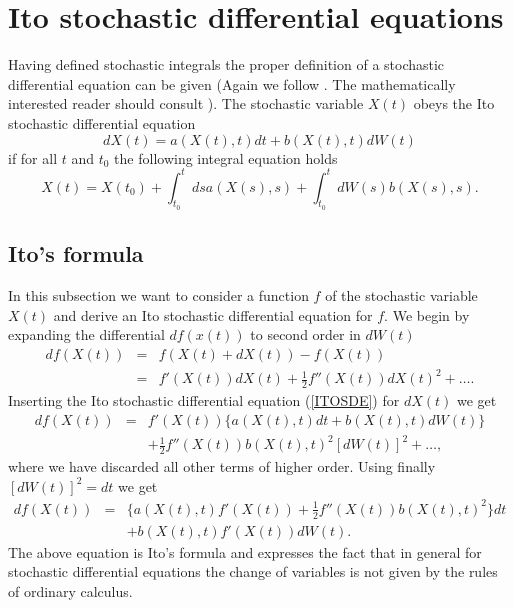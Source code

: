 \section{Ito stochastic differential equations}
Having defined stochastic integrals the proper definition of a
stochastic differential equation can be given (Again we follow 
\cite{GARDINER}. The mathematically interested reader should
consult \cite{GARD,KLOEDEN_AN,POTTER}). The stochastic variable
$X(t)$ obeys the Ito stochastic differential equation
\begin{equation}
\label{ITOSDE}
dX(t) = a(X(t),t) dt + b(X(t),t) dW(t)
\end{equation}
if for all $t$ and $t_0$ the following integral equation holds
\begin{equation}
X(t) = X(t_0) + \int_{t_0}^t ds a(X(s),s) 
     + \int_{t_0}^t dW(s) b(X(s),s).
\end{equation}

\subsection{Ito's formula}
In this subsection we want to consider a function
$f$ of the stochastic variable $X(t)$ and derive an Ito stochastic
differential equation for $f$. We begin by expanding the differential 
$df(x(t))$ to second order in $dW(t)$
\begin{eqnarray*}
df(X(t)) & = & f(X(t)+dX(t)) - f(X(t)) \\
         & = & f'(X(t)) dX(t) + \frac{1}{2} f''(X(t)) dX(t)^2 + \ldots.
\end{eqnarray*}
Inserting the Ito stochastic differential equation (\ref{ITOSDE})
for $dX(t)$ we get
\begin{eqnarray*}
df(X(t)) &=&  f'(X(t)) \{a(X(t),t)dt + b(X(t),t) dW(t) \} \\
      & & + \frac{1}{2} f''(X(t)) b(X(t),t)^2 [dW(t)]^2 + \ldots ,
\end{eqnarray*}
where we have discarded all other terms of higher order. Using
finally $[dW(t)]^2 =dt$ we get
\begin{eqnarray}
\label{ITOFORMULA}
df(X(t)) &=& \{a(X(t),t) f'(X(t)) +  \frac{1}{2} f''(X(t)) b(X(t),t)^2
\} dt  \nonumber \\
    & & + b(X(t),t)f'(X(t)) dW(t).
\end{eqnarray}
The above equation is Ito's formula and expresses the fact that 
in general for stochastic differential equations
the change of variables is not given by the rules of 
ordinary calculus.


